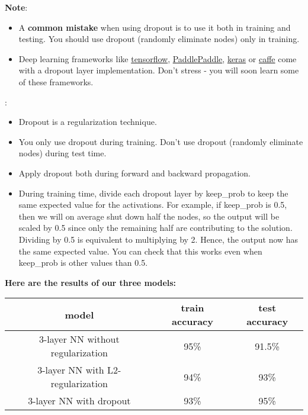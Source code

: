 {\textbf {Note}}:
\begin{itemize}
\item A {\textbf {common mistake}} when using dropout is to use it both in training and testing. You should use dropout (randomly eliminate nodes) only in training. 
\item Deep learning frameworks like \href{https://www.tensorflow.org/api_docs/python/tf/nn/dropout}{tensorflow}, \href{http://doc.paddlepaddle.org/release_doc/0.9.0/doc/ui/api/trainer_config_helpers/attrs.html}{PaddlePaddle}, \href{https://keras.io/layers/core/\#dropout)}{keras} or \href{http://caffe.berkeleyvision.org/tutorial/layers/dropout.html}{caffe} come with a dropout layer implementation. Don't stress - you will soon learn some of these frameworks.
\end{itemize}

{:
\begin{itemize}
\item Dropout is a regularization technique.
\item You only use dropout during training. Don't use dropout (randomly eliminate nodes) during test time.
\item Apply dropout both during forward and backward propagation.
\item During training time, divide each dropout layer by keep\_prob to keep the same expected value for the activations. For example, if keep\_prob is 0.5, then we will on average shut down half the nodes, so the output will be scaled by 0.5 since only the remaining half are contributing to the solution. Dividing by 0.5 is equivalent to multiplying by 2. Hence, the output now has the same expected value. You can check that this works even when keep\_prob is other values than 0.5.  
\end{itemize}
}


{\textbf {Here are the results of our three models:}}
\begin{table}[H]
\centering
\begin{tabular}{ccc}  
\toprule
model	&train accuracy	 &test accuracy\\
\midrule
3-layer NN without regularization&	95\%	&91.5\%\\
3-layer NN with L2-regularization&	94\%	&93\%\\
3-layer NN with dropout&	93\%	&95\%\\
\bottomrule
\end{tabular}
\end{table}

